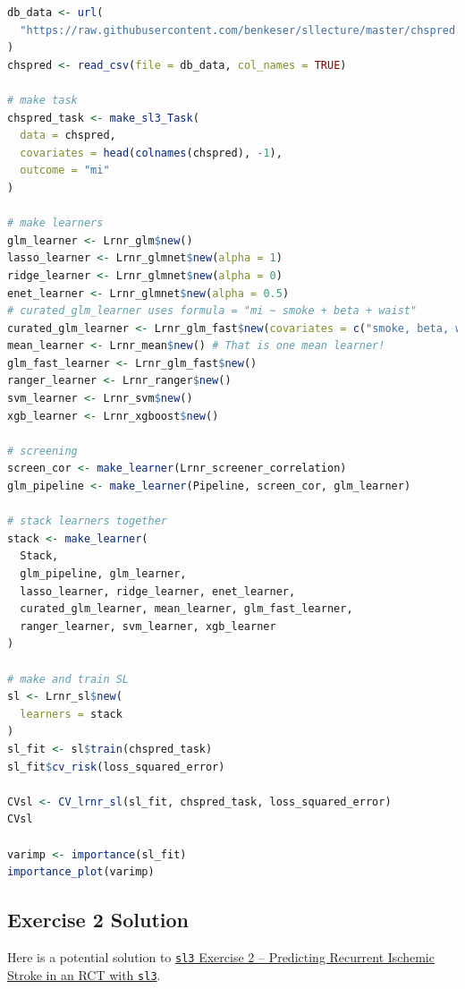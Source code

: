 \documentclass[
  12pt, krantz2,
]{krantz}
\newcommand{\passthrough}[1]{#1}
\theoremstyle{definition}
\theoremstyle{definition}
\theoremstyle{definition}
\newcommand{\1}{\mathbbm{1}}
\begin{document}
\begin{lstlisting}[language=R]
db_data <- url(
  "https://raw.githubusercontent.com/benkeser/sllecture/master/chspred.csv"
)
chspred <- read_csv(file = db_data, col_names = TRUE)

# make task
chspred_task <- make_sl3_Task(
  data = chspred,
  covariates = head(colnames(chspred), -1),
  outcome = "mi"
)

# make learners
glm_learner <- Lrnr_glm$new()
lasso_learner <- Lrnr_glmnet$new(alpha = 1)
ridge_learner <- Lrnr_glmnet$new(alpha = 0)
enet_learner <- Lrnr_glmnet$new(alpha = 0.5)
# curated_glm_learner uses formula = "mi ~ smoke + beta + waist"
curated_glm_learner <- Lrnr_glm_fast$new(covariates = c("smoke, beta, waist"))
mean_learner <- Lrnr_mean$new() # That is one mean learner!
glm_fast_learner <- Lrnr_glm_fast$new()
ranger_learner <- Lrnr_ranger$new()
svm_learner <- Lrnr_svm$new()
xgb_learner <- Lrnr_xgboost$new()

# screening
screen_cor <- make_learner(Lrnr_screener_correlation)
glm_pipeline <- make_learner(Pipeline, screen_cor, glm_learner)

# stack learners together
stack <- make_learner(
  Stack,
  glm_pipeline, glm_learner,
  lasso_learner, ridge_learner, enet_learner,
  curated_glm_learner, mean_learner, glm_fast_learner,
  ranger_learner, svm_learner, xgb_learner
)

# make and train SL
sl <- Lrnr_sl$new(
  learners = stack
)
sl_fit <- sl$train(chspred_task)
sl_fit$cv_risk(loss_squared_error)

CVsl <- CV_lrnr_sl(sl_fit, chspred_task, loss_squared_error)
CVsl

varimp <- importance(sl_fit)
importance_plot(varimp) 
\end{lstlisting}

\hypertarget{sl3ex2-sol}{%
\subsection{Exercise 2 Solution}\label{sl3ex2-sol}}

Here is a potential solution to \protect\hyperlink{sl3ex2}{\passthrough{\lstinline!sl3!} Exercise 2 -- Predicting Recurrent
Ischemic Stroke in an RCT with \passthrough{\lstinline!sl3!}}.
\end{document}
